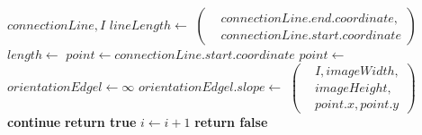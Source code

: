 \begin{algorithm}[!ht]
\caption{}
\label{alg:isconnectionlinebridged}
\begin{algorithmic}[1]
	\Require $\mathit{connectionLine},I$
	\State $\mathit{lineLength} \gets$ 
	$\left(
	\begin{aligned}
		& \mathit{connectionLine.end.coordinate},\\
		& \mathit{connectionLine.start.coordinate}
	\end{aligned}\right)$
	\label{alg:isconnectionlinebridged-length-start}
	\State $\mathit{length} \gets$ 
	\State $\mathit{point} \gets \mathit{connectionLine.start.coordinate}$
	\label{alg:isconnectionlinebridged-length-end}
	\label{alg:isconnectionlinebridged-loop-start}
		\State $\mathit{point} \gets$ 
		\State $\mathit{orientationEdgel} \gets \infty$
		\State $\mathit{orientationEdgel.slope} \gets$ 
		$\left(
		\begin{aligned}
			& I,\mathit{imageWidth},\\
			& \mathit{imageHeight},\\
			& \mathit{point.x}, \mathit{point.y}
		\end{aligned}\right)$
		\label{alg:isconnectionlinebridged-gradient}
		\label{alg:isconnectionlinebridged-iscompatible}
			\State \textbf{continue}
		\EndIf
		\State \textbf{return true}
		\label{alg:isconnectionlinebridged-bridged}
		\State $i \gets i + 1$
	\EndFor
	\label{alg:isconnectionlinebridged-loop-end}
	\State \textbf{return false}
	\label{alg:isconnectionlinebridged-notbridged}
\end{algorithmic}
\end{algorithm}
